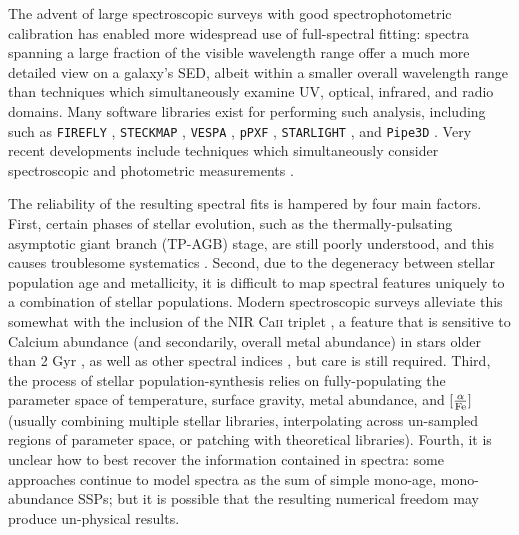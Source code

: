 The advent of large spectroscopic surveys with good spectrophotometric calibration has enabled more widespread use of full-spectral fitting: spectra spanning a large fraction of the visible wavelength range offer a much more detailed view on a galaxy's SED, albeit within a smaller overall wavelength range than techniques which simultaneously examine UV, optical, infrared, and radio domains. Many software libraries exist for performing such analysis, including such as \texttt{FIREFLY} \citep{firefly_wilkinson_pmanga}, \texttt{STECKMAP} \citep{steckmap}, \texttt{VESPA} \citep{vespa_tojeiro}, \texttt{pPXF} \citep{cappellari_ppxf}, \texttt{STARLIGHT} \citep{starlight}, and \texttt{Pipe3D} \citep{pipe3d_i, pipe3d_ii}. Very recent developments include techniques which simultaneously consider spectroscopic and photometric measurements \citep{chevallard_charlot_16_beagle, thomas_le-fevre_17, fossati_mendel_18}.

The reliability of the resulting spectral fits is hampered by four main factors. First, certain phases of stellar evolution, such as the thermally-pulsating asymptotic giant branch (TP-AGB) stage, are still poorly understood, and this causes troublesome systematics \citep{maraston_06, marigo_08}. Second, due to the degeneracy between stellar population age and metallicity, it is difficult to map spectral features uniquely to a combination of stellar populations. Modern spectroscopic surveys alleviate this somewhat with the inclusion of the NIR Ca\textsc{ii} triplet \citep{terlevich_caII_89, vazdekis_caII_03}, a feature that is sensitive to Calcium abundance (and secondarily, overall metal abundance) in stars older than 2 Gyr \citep{usher_beckwith_18_CaT}, as well as other spectral indices \citep{spiniello_trager_12, spiniello_trager_14}, but care is still required. Third, the process of stellar population-synthesis relies on fully-populating the parameter space of temperature, surface gravity, metal abundance, and ${\rm [\frac{\alpha}{Fe}] }$ (usually combining multiple stellar libraries, interpolating across un-sampled regions of parameter space, or patching with theoretical libraries). Fourth, it is unclear how to best recover the information contained in spectra: some approaches continue to model spectra as the sum of simple mono-age, mono-abundance SSPs; but it is possible that the resulting numerical freedom may produce un-physical results.

